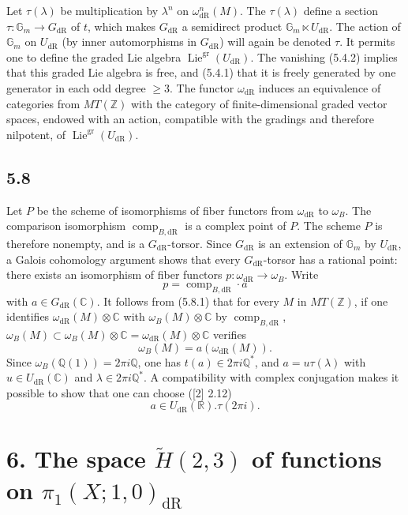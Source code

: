 \documentclass[11pt]{article}
\newcommand{\Q}{\mathbb Q}
\newcommand{\Z}{\mathbb Z}
\newcommand{\R}{\mathbb R}
\newcommand{\C}{\mathbb C}
\newcommand{\Gm}{\mathbb G_m}
\newcommand{\Lie}{\operatorname{Lie}}
\newcommand{\comp}{\operatorname{comp}}
\newcommand{\dR}{\mathrm{dR}}
\begin{document}
Let $\tau(\lambda)$ be multiplication by $\lambda^n$ on $\omega^n_{\dR}(M)$.
The $\tau(\lambda)$ define a section $\tau:\Gm\to G_{\dR}$ of $t$, which makes $G_{\dR}$ a semidirect product $\Gm\ltimes U_{\dR}$.
The action of $\Gm$ on $U_{\dR}$ (by inner automorphisms in $G_{\dR}$) will again be denoted $\tau$.
It permits one to define the graded Lie algebra $\Lie^{\mathrm{gr}}(U_{\dR})$.
The vanishing (5.4.2) implies that this graded Lie algebra is free, and (5.4.1) that it is freely generated by one generator in each odd degree $\geq3$.
The functor $\omega_{\dR}$ induces an equivalence of categories from $MT(\Z)$ with the category of finite-dimensional graded vector spaces, endowed with an action, compatible with the gradings and therefore nilpotent, of $\Lie^{\mathrm{gr}}(U_{\dR})$.

\subsection*{5.8}
Let $P$ be the scheme of isomorphisms of fiber functors from $\omega_{\dR}$ to $\omega_B$.
The comparison isomorphism $\comp_{B,\dR}$ is a complex point of $P$.
The scheme $P$ is therefore nonempty, and is a $G_{\dR}$-torsor.
Since $G_{\dR}$ is an extension of $\Gm$ by $U_{\dR}$, a Galois cohomology argument shows that every $G_{\dR}$-torsor has a rational point: there exists an isomorphism of fiber functors $p:\omega_{\dR}\to\omega_B$.
Write
\begin{equation}
 p=\comp_{B,\dR}\cdot a
\tag{5.8.1}
\end{equation}
with $a\in G_{\dR}(\C)$.
It follows from (5.8.1) that for every $M$ in $MT(\Z)$, if one identifies $\omega_{\dR}(M)\otimes\C$ with $\omega_B(M)\otimes\C$ by $\comp_{B,\dR}$, $\omega_B(M)\subset\omega_B(M)\otimes\C=\omega_{\dR}(M)\otimes\C$ verifies
\begin{equation}
 \omega_B(M)=a(\omega_{\dR}(M)).
\tag{5.8.2}
\end{equation}
Since $\omega_B(\Q(1))=2\pi i\Q$, one has $t(a)\in2\pi i\Q^*$, and $a=u\tau(\lambda)$ with $u\in U_{\dR}(\C)$ and $\lambda\in2\pi i\Q^*$.
A compatibility with complex conjugation makes it possible to show that one can choose ([2] 2.12)
\begin{equation}
 a\in U_{\dR}(\R).\tau(2\pi i).
\tag{5.8.3}
\end{equation}

\section*{6. The space $\widetilde H(2,3)$ of functions on $\pi_1(X;1,0)_{\dR}$}
\end{document}
